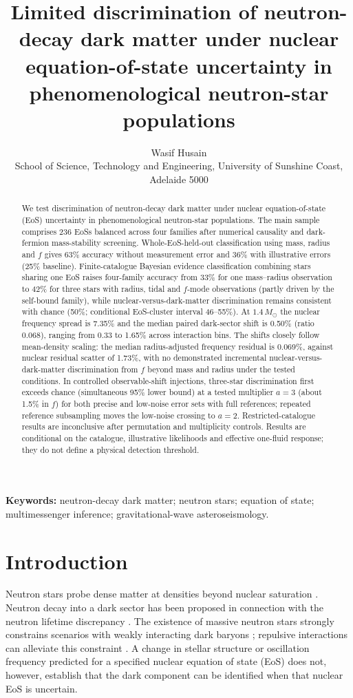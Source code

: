 \documentclass[11pt,a4paper]{article}
\title{Limited discrimination of neutron-decay dark matter under nuclear equation-of-state uncertainty in phenomenological neutron-star populations}
\author{Wasif Husain\\ \small School of Science, Technology and Engineering, University of Sunshine Coast, Adelaide 5000}
\date{}
\begin{document}
\maketitle

\begin{abstract}
We test discrimination of neutron-decay dark matter under nuclear equation-of-state (EoS) uncertainty in phenomenological neutron-star populations. The main sample comprises 236 EoSs balanced across four families after numerical causality and dark-fermion mass-stability screening. Whole-EoS-held-out classification using mass, radius and $f$ gives 63\% accuracy without measurement error and 36\% with illustrative errors (25\% baseline). Finite-catalogue Bayesian evidence classification combining stars sharing one EoS raises four-family accuracy from 33\% for one mass--radius observation to 42\% for three stars with radius, tidal and $f$-mode observations (partly driven by the self-bound family), while nuclear-versus-dark-matter discrimination remains consistent with chance (50\%; conditional EoS-cluster interval 46--55\%). At $1.4\,M_\odot$ the nuclear frequency spread is 7.35\% and the median paired dark-sector shift is 0.50\% (ratio 0.068), ranging from 0.33 to 1.65\% across interaction bins. The shifts closely follow mean-density scaling: the median radius-adjusted frequency residual is 0.069\%, against nuclear residual scatter of 1.73\%, with no demonstrated incremental nuclear-versus-dark-matter discrimination from $f$ beyond mass and radius under the tested conditions. In controlled observable-shift injections, three-star discrimination first exceeds chance (simultaneous 95\% lower bound) at a tested multiplier $a=3$ (about 1.5\% in $f$) for both precise and low-noise error sets with full references; repeated reference subsampling moves the low-noise crossing to $a=2$. Restricted-catalogue results are inconclusive after permutation and multiplicity controls. Results are conditional on the catalogue, illustrative likelihoods and effective one-fluid response; they do not define a physical detection threshold.
\end{abstract}
\medskip\noindent\textbf{Keywords:} neutron-decay dark matter; neutron stars; equation of state; multimessenger inference; gravitational-wave asteroseismology.
\section{Introduction}
Neutron stars probe dense matter at densities beyond nuclear saturation \citep{LP04,OF16}. Neutron decay into a dark sector has been proposed in connection with the neutron lifetime discrepancy \citep{FG18}. The existence of massive neutron stars strongly constrains scenarios with weakly interacting dark baryons \citep{McKeen18,Baym18,Motta18}; repulsive interactions can alleviate this constraint \citep{Husain22}. A change in stellar structure or oscillation frequency predicted for a specified nuclear equation of state (EoS) does not, however, establish that the dark component can be identified when that nuclear EoS is uncertain.
\end{document}
